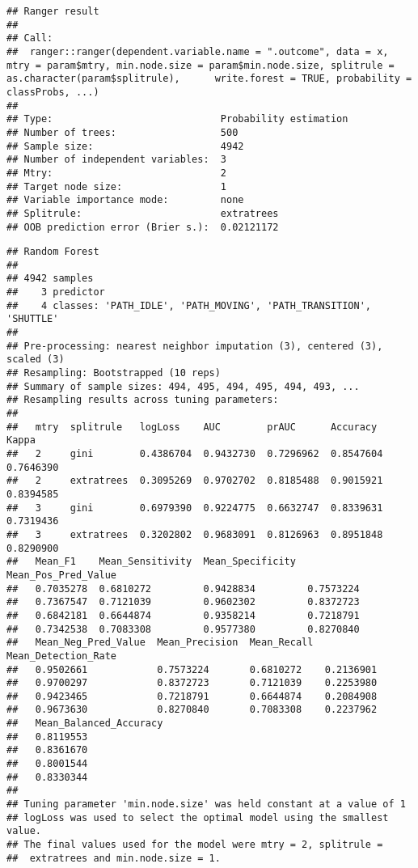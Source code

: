 \documentclass[]{article}
\begin{document}
\begin{verbatim}
## Ranger result
## 
## Call:
##  ranger::ranger(dependent.variable.name = ".outcome", data = x,      mtry = param$mtry, min.node.size = param$min.node.size, splitrule = as.character(param$splitrule),      write.forest = TRUE, probability = classProbs, ...) 
## 
## Type:                             Probability estimation 
## Number of trees:                  500 
## Sample size:                      4942 
## Number of independent variables:  3 
## Mtry:                             2 
## Target node size:                 1 
## Variable importance mode:         none 
## Splitrule:                        extratrees 
## OOB prediction error (Brier s.):  0.02121172
\end{verbatim}

\begin{verbatim}
## Random Forest 
## 
## 4942 samples
##    3 predictor
##    4 classes: 'PATH_IDLE', 'PATH_MOVING', 'PATH_TRANSITION', 'SHUTTLE' 
## 
## Pre-processing: nearest neighbor imputation (3), centered (3), scaled (3) 
## Resampling: Bootstrapped (10 reps) 
## Summary of sample sizes: 494, 495, 494, 495, 494, 493, ... 
## Resampling results across tuning parameters:
## 
##   mtry  splitrule   logLoss    AUC        prAUC      Accuracy   Kappa    
##   2     gini        0.4386704  0.9432730  0.7296962  0.8547604  0.7646390
##   2     extratrees  0.3095269  0.9702702  0.8185488  0.9015921  0.8394585
##   3     gini        0.6979390  0.9224775  0.6632747  0.8339631  0.7319436
##   3     extratrees  0.3202802  0.9683091  0.8126963  0.8951848  0.8290900
##   Mean_F1    Mean_Sensitivity  Mean_Specificity  Mean_Pos_Pred_Value
##   0.7035278  0.6810272         0.9428834         0.7573224          
##   0.7367547  0.7121039         0.9602302         0.8372723          
##   0.6842181  0.6644874         0.9358214         0.7218791          
##   0.7342538  0.7083308         0.9577380         0.8270840          
##   Mean_Neg_Pred_Value  Mean_Precision  Mean_Recall  Mean_Detection_Rate
##   0.9502661            0.7573224       0.6810272    0.2136901          
##   0.9700297            0.8372723       0.7121039    0.2253980          
##   0.9423465            0.7218791       0.6644874    0.2084908          
##   0.9673630            0.8270840       0.7083308    0.2237962          
##   Mean_Balanced_Accuracy
##   0.8119553             
##   0.8361670             
##   0.8001544             
##   0.8330344             
## 
## Tuning parameter 'min.node.size' was held constant at a value of 1
## logLoss was used to select the optimal model using the smallest value.
## The final values used for the model were mtry = 2, splitrule =
##  extratrees and min.node.size = 1.
\end{verbatim}
\end{document}
